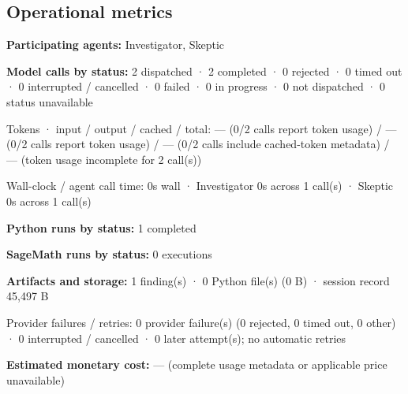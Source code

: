 \documentclass[11pt]{article}
\begin{document}
\subsection{Operational metrics}
\textbf{Participating agents:} Investigator, Skeptic\par
\textbf{Model calls by status:} 2 dispatched · 2 completed · 0 rejected · 0 timed out · 0 interrupted / cancelled · 0 failed · 0 in progress · 0 not dispatched · 0 status unavailable\par
Tokens · input / output / cached / total: — (0/2 calls report token usage) / — (0/2 calls report token usage) / — (0/2 calls include cached-token metadata) / — (token usage incomplete for 2 call(s))\par
Wall-clock / agent call time: 0s wall · Investigator 0s across 1 call(s) · Skeptic 0s across 1 call(s)\par
\textbf{Python runs by status:} 1 completed\par
\textbf{SageMath runs by status:} 0 executions\par
\textbf{Artifacts and storage:} 1 finding(s) · 0 Python file(s) (0 B) · session record 45,497 B\par
Provider failures / retries: 0 provider failure(s) (0 rejected, 0 timed out, 0 other) · 0 interrupted / cancelled · 0 later attempt(s); no automatic retries\par
\textbf{Estimated monetary cost:} — (complete usage metadata or applicable price unavailable)\par
\end{document}
